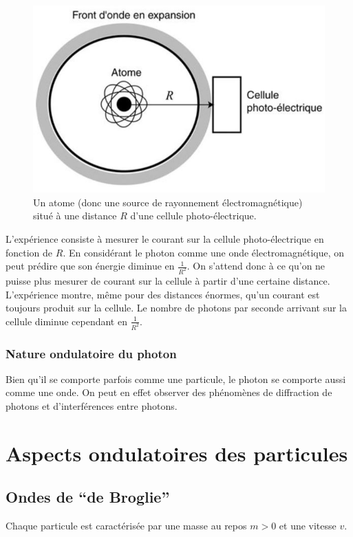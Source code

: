 \begin{figure}[ht!]
	\centering
	\includegraphics[scale=0.5]{exp_photon_2.jpg}
	\caption{Un atome (donc une source de rayonnement
	électromagnétique) situé à une distance $R$ d'une cellule
	photo-électrique.}
	\label{fig:exp-photon2}
\end{figure}

L'expérience consiste à mesurer le courant
sur la cellule photo-électrique en fonction de $R$.
En considérant le photon comme une onde électromagnétique,
on peut prédire que son énergie diminue en $\frac{1}{R^2}$. On s'attend
donc à ce qu'on ne puisse plus mesurer de courant sur
la cellule à partir d'une certaine distance.
L'expérience montre, même pour des distances énormes,
qu'un courant est toujours produit sur la cellule.
Le nombre de photons par seconde arrivant sur la cellule
diminue cependant en $\frac{1}{R^2}$.

\subsubsection{Nature ondulatoire du photon}
Bien qu'il se comporte parfois comme une particule,
le photon se comporte aussi comme une onde. On peut
en effet observer des phénomènes de diffraction de photons
et d'interférences entre photons.

\section{Aspects ondulatoires des particules}
\subsection{Ondes de ``de Broglie''}
Chaque particule est caractérisée par une masse au repos $m > 0$
et une vitesse $v$.

